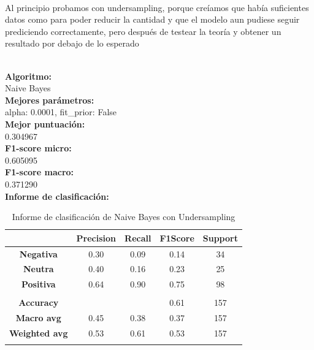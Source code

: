 \documentclass{report}
\begin{document}
{                \paragraph*{}
                {
                    Al principio probamos con undersampling, porque creíamos que había suficientes datos como para poder reducir la cantidad y que el modelo aun pudiese seguir prediciendo correctamente, pero después de testear la teoría y obtener un resultado por debajo de lo esperado \color{red}{Peor puntación:}
                }
                     \\
                    \phantom{}
                    \\
                    \begin{center}{
                    \textbf{Algoritmo: }
                    \\
                    Naive Bayes
                    \\
                    \textbf{Mejores parámetros: }
                    \\
                    alpha: 0.0001, fit\_prior: False
                    \\
                    \textbf{Mejor puntuación: }
                    \\
                    0.304967
                    \\
                    \textbf{F1-score micro: }
                    \\
                    0.605095
                    \\
                    \textbf{F1-score macro: }
                    \\
                    0.371290
                    \\
                    \textbf{Informe de clasificación: }

                    \begin{longtable}{|c|c|c|c|c|}
                    \hline
                    & \textbf{Precision} & \textbf{Recall} & \textbf{F1Score} & \textbf{Support} \\
                    \hline
                    \textbf{Negativa} & 0.30 & 0.09 & 0.14 & 34 \\
                    \hline
                    \textbf{Neutra} & 0.40 & 0.16 & 0.23 & 25 \\
                    \hline
                    \textbf{Positiva} & 0.64 & 0.90 & 0.75 & 98 \\
                    \hline
                    & \phantom{} & \phantom{} & \phantom{} & \phantom{} \\
                    \hline
                    \textbf{Accuracy} &  &  & 0.61 & 157 \\
                    \hline
                    \textbf{Macro avg} & 0.45 & 0.38 & 0.37 & 157 \\
                    \hline
                    \textbf{Weighted avg} & 0.53 & 0.61 & 0.53 & 157 \\
                    \hline
                    \caption{Informe de clasificación de Naive Bayes con Undersampling}
                    \end{longtable}
            
}
\end{center}}
\end{document}
